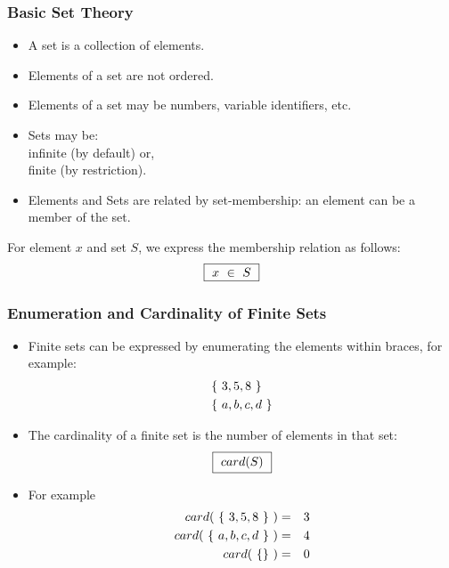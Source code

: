 \documentclass{beamer}
\begin{document}
\begin{frame}
\frametitle{Basic Set Theory}
\begin{itemize}
\item 
A \alert{set} is a collection of \alert{elements}.  

\item Elements of a set are \alert{not ordered}.

\item Elements of a set may be numbers, variable identifiers, etc.

\item Sets may be:\\\quad \alert{infinite} (by default) or,\\\quad \alert{finite} (by restriction).

\item Elements and Sets are related by set-membership: an element can be a \alert{member} of the set.

\end{itemize}

For \alert{element $x$} and \alert{set $S$,} we express the \alert{membership relation} as follows:
\begin{eqnarray*}
\fbox{~$
    x  ~\in~ S
~$}
\end{eqnarray*}


\end{frame}




\begin{frame}
\frametitle{ Enumeration and Cardinality of Finite Sets}

\begin{itemize}
\item Finite sets can be expressed by \alert{enumerating} the elements within braces, for example:
\begin{eqnarray*}
&\{~3,5,8~\} \\
&\{~ a,b,c,d ~\}
\end{eqnarray*}
\end{itemize}

\begin{itemize}
\item The \alert{cardinality} of a finite set is the number of elements in that set:
\begin{eqnarray*}
\fbox{~$
    card(S)
~$}
\end{eqnarray*}
\item For example
\begin{eqnarray*}
card(~\{~3,5,8~\}~) &=& 3 \\
card(~\{~ a,b,c,d ~\}~) &=& 4\\
card(~\{\}~) &=& 0
\end{eqnarray*}
\end{itemize}

\end{frame}
\end{document}

